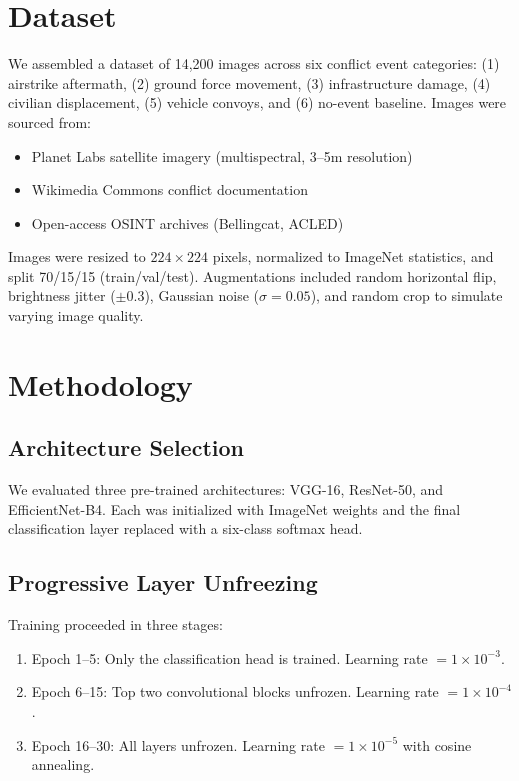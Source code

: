 \documentclass[conference]{IEEEtran}
\begin{document}
\section{Dataset}

We assembled a dataset of 14,200 images across six conflict event categories: (1) airstrike aftermath, (2) ground force movement, (3) infrastructure damage, (4) civilian displacement, (5) vehicle convoys, and (6) no-event baseline. Images were sourced from:
\begin{itemize}
\item Planet Labs satellite imagery (multispectral, 3--5m resolution)
\item Wikimedia Commons conflict documentation
\item Open-access OSINT archives (Bellingcat, ACLED)
\end{itemize}

Images were resized to $224 \times 224$ pixels, normalized to ImageNet statistics, and split 70/15/15 (train/val/test). Augmentations included random horizontal flip, brightness jitter ($\pm 0.3$), Gaussian noise ($\sigma = 0.05$), and random crop to simulate varying image quality.

\section{Methodology}

\subsection{Architecture Selection}
We evaluated three pre-trained architectures: VGG-16, ResNet-50, and EfficientNet-B4. Each was initialized with ImageNet weights and the final classification layer replaced with a six-class softmax head.

\subsection{Progressive Layer Unfreezing}
Training proceeded in three stages:
\begin{enumerate}
\item Epoch 1--5: Only the classification head is trained. Learning rate $= 1 \times 10^{-3}$.
\item Epoch 6--15: Top two convolutional blocks unfrozen. Learning rate $= 1 \times 10^{-4}$.
\item Epoch 16--30: All layers unfrozen. Learning rate $= 1 \times 10^{-5}$ with cosine annealing.
\end{enumerate}
\end{document}
